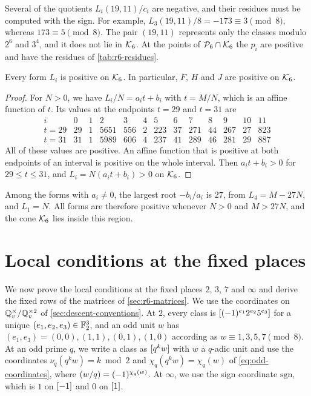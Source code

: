 Several of the quotients $L_i(19,11)/c_i$ are negative, and their residues must be computed with the sign. For example, $L_3(19,11)/8=-173\equiv3\pmod8$, whereas $173\equiv5\pmod8$. The pair $(19,11)$ represents only the classes modulo $2^6$ and $3^4$, and it does not lie in $\mathcal K_6$. At the points of $\mathcal P_6\cap\mathcal K_6$ the $p_i$ are positive and have the residues of \cref{tab:r6-residues}.

\begin{lemma}\label{lem:r6-cone}
Every form $L_i$ is positive on $\mathcal K_6$. In particular, $F$, $H$ and $J$ are positive on $\mathcal K_6$.
\end{lemma}

\begin{proof}
For $N>0$, we have $L_i/N=a_it+b_i$ with $t=M/N$, which is an affine function of $t$. Its values at the endpoints $t=29$ and $t=31$ are
\[
\begin{array}{c|rrrrrrrrrrrr}
i & 0 & 1 & 2 & 3 & 4 & 5 & 6 & 7 & 8 & 9 & 10 & 11\\
\hline
t=29 & 29 & 1 & 5651 & 556 & 2 & 223 & 37 & 271 & 44 & 267 & 27 & 823\\
t=31 & 31 & 1 & 5989 & 606 & 4 & 237 & 41 & 289 & 46 & 281 & 29 & 887
\end{array}
\]
All of these values are positive. An affine function that is positive at both endpoints of an interval is positive on the whole interval. Then $a_it+b_i>0$ for $29\le t\le31$, and $L_i=N(a_it+b_i)>0$ on $\mathcal K_6$.
\end{proof}

Among the forms with $a_i\ne0$, the largest root $-b_i/a_i$ is $27$, from $L_4=M-27N$, and $L_1=N$. All forms are therefore positive whenever $N>0$ and $M>27N$, and the cone $\mathcal K_6$ lies inside this region.

\section{Local conditions at the fixed places}\label{sec:r6-fixed}

We now prove the local conditions at the fixed places $2$, $3$, $7$ and $\infty$ and derive the fixed rows of the matrices of \cref{sec:r6-matrices}. We use the coordinates on $\mathbb Q_v^{\times}/\mathbb Q_v^{\times2}$ of \cref{sec:descent-conventions}. At $2$, every class is $[(-1)^{e_1}2^{e_2}5^{e_3}]$ for a unique $(e_1,e_2,e_3)\in\mathbb F_2^3$, and an odd unit $w$ has $(e_1,e_3)=(0,0),(1,1),(0,1),(1,0)$ according as $w\equiv1,3,5,7\pmod8$. At an odd prime $q$, we write a class as $[q^kw]$ with $w$ a $q$-adic unit and use the coordinates $\nu_q(q^kw)=k\bmod2$ and $\chi_q(q^kw)=\chi_q(w)$ of \eqref{eq:odd-coordinates}, where $\leg wq=(-1)^{\chi_q(w)}$. At $\infty$, we use the sign coordinate $\mathrm{sgn}$, which is $1$ on $[-1]$ and $0$ on $[1]$.

